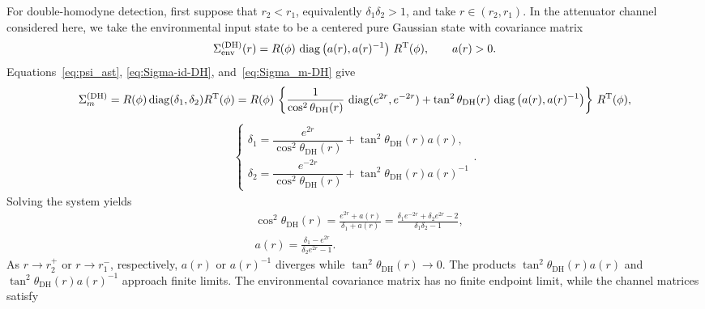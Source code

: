 \documentclass[%
final, 
superscriptaddress,
 amsmath,amssymb,amsfonts,
 aps,
 pra,
 longbibliography,
]{revtex4-2}
\newcommand{\tcnj}[1]{{#1}^{\mathrm{T}}}
\newcommand{\diag}{\mathop{\rm diag}\nolimits}
\newcommand{\ind}[1]{\mathrm{#1}}
\begin{document}
For double-homodyne detection, first suppose that $r_2<r_1$, equivalently $\delta_1\delta_2>1$, and take $r\in(r_2,r_1)$. In the attenuator channel considered here, we take the environmental input state to be a centered pure Gaussian state with covariance matrix
\begin{align}
  \label{eq:anc-dh-def}
    \Sigma_{\ind{env}}^{(\ind{DH})}(r)
    =R(\phi)\,\diag\left(a(r),a(r)^{-1}\right)\,\tcnj{R}(\phi),
    \qquad a(r)>0.
\end{align}
Equations~\eqref{eq:psi_ast}, \eqref{eq:Sigma-id-DH}, and~\eqref{eq:Sigma_m-DH} give
\begin{align}
  \Sigma_{m}^{(\ind{DH})}=
  R(\phi)\diag(\delta_1,\delta_2)\tcnj{R}(\phi)
  =R(\phi)\,\left\{
    \frac{1}{\cos^2\theta_{\ind{DH}}(r)}\,\diag(e^{2r},e^{-2r})
    +
    \tan^2\theta_{\ind{DH}}(r)\,\diag\left(a(r),a(r)^{-1}\right)
    \right\}\,\tcnj{R}(\phi),
\end{align}
\begin{align}
    \label{eq:system-dh}
    \begin{cases}
        \delta_1=\dfrac{e^{2r}}{\cos^2\theta_{\ind{DH}}(r)}+\tan^2\theta_{\ind{DH}}(r)a(r),\\[2mm]
        \delta_2=\dfrac{e^{-2r}}{\cos^2\theta_{\ind{DH}}(r)}+\tan^2\theta_{\ind{DH}}(r)a(r)^{-1}
    \end{cases}.
  \end{align}
Solving the system yields
\begin{align}
    \label{eq:cos-theta-dh}
    &\cos^2\theta_{\ind{DH}}(r)={\frac{e^{2r}+a(r)}{\delta_1+a(r)}}=
    \frac{\delta_1 e^{-2r}+\delta_2e^{2r}-2}{\delta_1\delta_2-1}
    ,\\
    \label{eq:a_def}
    &a(r)=\frac{\delta_{1}-e^{2 r}}{\delta_{2} e^{2 r}-1}.%
\end{align}
As $r\to r_2^+$ or $r\to r_1^-$, respectively, $a(r)$ or $a(r)^{-1}$ diverges while $\tan^2\theta_{\ind{DH}}(r)\to0$. The products $\tan^2\theta_{\ind{DH}}(r)a(r)$ and $\tan^2\theta_{\ind{DH}}(r)a(r)^{-1}$ approach finite limits. The environmental covariance matrix has no finite endpoint limit, while the channel matrices satisfy
\end{document}

